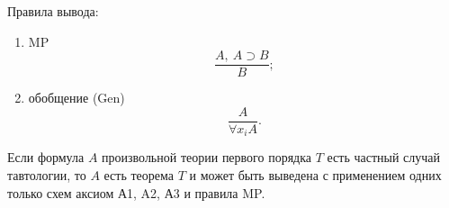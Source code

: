 Правила вывода:
\begin{enumerate}[label=\arabic*)]
    \item MP
    \[
        \frac{A,\ A \supset B}{B};
    \]
    \item обобщение (Gen)
    \[
        \frac{A}{\forall x_iA}.
    \]
\end{enumerate}

\begin{lemma}
    Если формула $A$ произвольной теории первого порядка $T$ есть частный случай тавтологии, то $A$ есть теорема $T$ и может быть выведена с применением одних только схем аксиом А1, A2, А3 и правила MP.
\end{lemma}